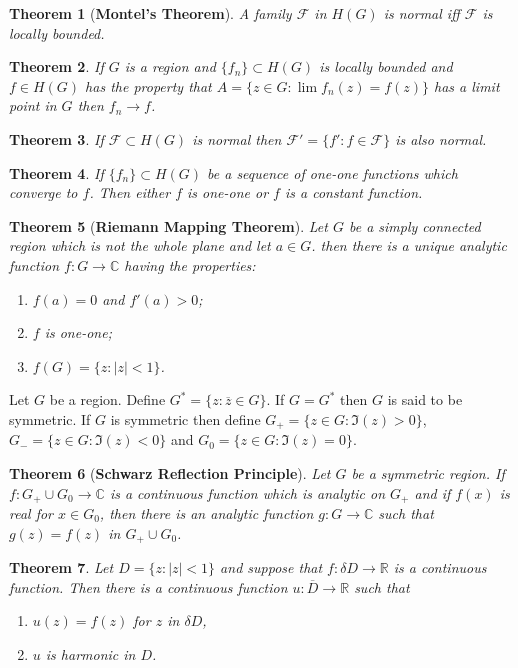\documentclass[answers, a4paper, 12pt]{exam}
\newtheorem{theorem}{Theorem}[section]
\newcommand{\C}{\mathbb{C}}
\newcommand{\R}{\mathbb{R}}
\begin{document}
\begin{theorem}[\textbf{Montel's Theorem}]
    A family $\mathcal{F}$ in $H(G)$ is normal iff $\mathcal{F}$ is locally bounded.
\end{theorem}

\begin{theorem}
    If $G$ is a region and $\{f_n\}\subset H(G)$ is locally bounded and $f\in H(G)$ has the property that $A=\{z\in G: \lim{f_n(z)=f(z)}\}$ has a limit point in $G$ then $f_n\to f$.
\end{theorem}

\begin{theorem}
    If $\mathcal{F}\subset H(G)$ is normal then $\mathcal{F}'=\{f': f\in\mathcal{F}\}$ is also normal.
\end{theorem}

\begin{theorem}
    If $\{f_n\}\subset H(G)$ be a sequence of one-one functions which converge to $f$. Then either $f$ is one-one or $f$ is a constant function.
\end{theorem}

\begin{theorem}[\textbf{Riemann Mapping Theorem}]
    Let $G$ be a simply connected region which is not the whole plane and let $a\in G$. then there is a unique analytic function $f:G\to\C$ having the properties:
    \begin{enumerate}
        \item $f(a)=0$ and $f'(a)>0$;
        \item $f$ is one-one;
        \item $f(G)=\{z:|z|<1\}$.
    \end{enumerate}
\end{theorem}

\justifying Let $G$ be a region. Define $G^*=\{z: \overline{z}\in G\}$. If $G=G^*$ then $G$ is said to be symmetric. If $G$ is symmetric then define $G_+=\{z\in G:\Im(z)>0\}$,  $G_-=\{z\in G:\Im(z)<0\}$ and $G_0=\{z\in G:\Im(z)=0\}$.

\begin{theorem}[\textbf{Schwarz Reflection Principle}]
    Let $G$ be a symmetric region. If $f:G_+\cup G_0\to\C$ is a continuous function which is analytic on $G_+$ and if $f(x)$ is real for $x\in G_0$, then there is an analytic function $g:G\to\C$ such that $g(z)=f(z)$ in $G_+\cup G_0$.
\end{theorem}

\begin{theorem}
    Let $D=\{z: |z|<1\}$ and suppose that $f:\delta D\to\R$ is a continuous function. Then there is a continuous function $u:\overline{D}\to\R$ such that
    \begin{enumerate}
        \item $u(z)=f(z)$ for $z$ in $\delta D$,
        \item $u$ is harmonic in $D$.
    \end{enumerate}
\end{theorem}
\end{document}
